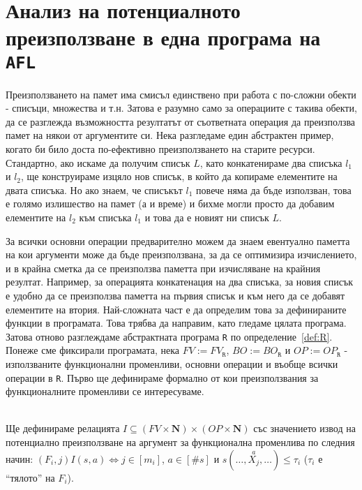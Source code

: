 \documentclass[12pt,twoside,a4paper]{article}
\begin{document}
	\section{Анализ на потенциалното преизползване в една програма на \texttt{AFL}}
	Преизползването на памет има смисъл единствено при работа с по-сложни обекти - списъци, множества и т.н. Затова е разумно само за операциите с такива обекти, да се разглежда възможността резултатът от съответната операция да преизползва памет на някои от аргументите си. Нека разгледаме един абстрактен пример, когато би било доста по-ефективно преизползването на старите ресурси. Стандартно, ако искаме да получим списък $L$, като конкатенираме два списъка $l_1$ и $l_2$, ще конструираме изцяло нов списък, в който да копираме елементите на двата списъка. Но ако знаем, че списъкът $l_1$ повече няма да бъде използван, това е голямо излишество на памет (а и време) и бихме могли просто да добавим елементите на $l_2$ към списъка $l_1$ и това да е новият ни списък $L$.
	
	За всички основни операции предварително можем да знаем евентуално паметта на кои аргументи може да бъде преизползвана, за да се оптимизира изчислението, и в крайна сметка да се преизползва паметта при изчисляване на крайния резултат. Например, за операцията конкатенация на два списъка, за новия списък е удобно да се преизползва паметта на първия списък и към него да се добавят елементите на втория. Най-сложната част е да определим това за дефинираните функции в програмата. Това трябва да направим, като гледаме цялата програма. Затова отново разглеждаме абстрактната програма \texttt{R} по определение~\ref{def:R}. Понеже сме фиксирали програмата, нека $FV := FV_\texttt{R}$, $BO := BO_\texttt{R}$ и $OP := OP_\texttt{R}$ - използваните функционални променливи, основни операции и въобще всички операции в \texttt{R}. Първо ще дефинираме формално от кои преизползвания за функционалните променливи се интересуваме.
	
	\begin{definition}\label{def:I}~\\
		\indent Ще дефинираме релацията $I \subseteq (FV \times \mathbf{N}) \times (OP \times \mathbf{N})$ със значението извод на потенциално преизползване на аргумент за функционална променлива по следния начин: $(F_i, j)I(s, a) \iff j \in [m_i]$, $a \in [\#s]$ и $s(\dots, \overset{a}{X_j}, \dots) \le \tau_i$ ($\tau_i$ е "`тялото"' на $F_i$).
	\end{definition}
	
\end{document}
